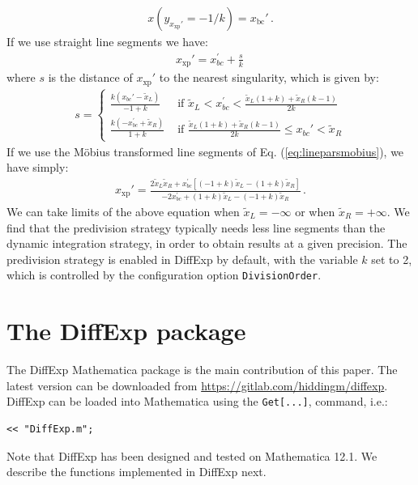 \documentclass{article}
\begin{document}
\begin{align}
    x(y_{x_{\text{xp}}'} = -1/k) = x_{\text{bc}}'\,.
\end{align}
If we use straight line segments we have:
\begin{align}
    x_{\text{xp}}' = x_{b c}^{\prime}+\frac{s}{k}\,
\end{align}
where $s$ is the distance of $x_{\text{xp}}'$ to the nearest singularity, which is given by:
\begin{align}
    s = \left\{\begin{array}{ll}
        \frac{k\left(x_{b c}'-\tilde{x}_{L}\right)}{-1+k} & \text { if } \tilde{x}_{L}<x_{b c}^{\prime}<\frac{\tilde{x}_{L}(1+k)+\tilde{x}_{R}(k-1)}{2 k} \\
        \frac{k\left(-x_{b c}^{\prime}+\tilde{x}_{R}\right)}{1+k} & \text { if } \frac{\tilde{x}_{L}(1+k)+\tilde{x}_{R}(k-1)}{2 k} \leq x_{b c}'<\tilde{x}_{R}
    \end{array}\right.
\end{align}
If we use the Möbius transformed line segments of Eq. (\ref{eq:lineparsmobius}), we have simply:
\begin{align}
    x_{\text{xp}}' = \frac{2 \tilde{x}_{L} \tilde{x}_{R}+x_{b c}^{\prime}\left[(-1+k) \tilde{x}_{L}-(1+k) \tilde{x}_{R}\right]}{-2 x_{b c}^{\prime}+(1+k) \tilde{x}_{L}-(-1+k) \tilde{x}_{R}}\,.
\end{align}
We can take limits of the above equation when $\tilde{x}_L = -\infty$ or when $\tilde{x}_R = +\infty$. We find that the predivision strategy typically needs less line segments than the dynamic integration strategy, in order to obtain results at a given precision. The predivision strategy is enabled in DiffExp by default, with the variable $k$ set to 2, which is controlled by the configuration option \texttt{DivisionOrder}.

\section{The DiffExp package}
\label{sec:DiffExp}
The DiffExp Mathematica package is the main contribution of this paper. The latest version can be downloaded from \href{https://gitlab.com/hiddingm/diffexp}{\color{airforceblue}https://gitlab.com/hiddingm/diffexp}. DiffExp can be loaded into Mathematica using the \texttt{Get[...]}, command, i.e.:
\begin{verbatim}
<< "DiffExp.m";
\end{verbatim}
Note that DiffExp has been designed and tested on Mathematica 12.1. We describe the functions implemented in DiffExp next.
\end{document}

